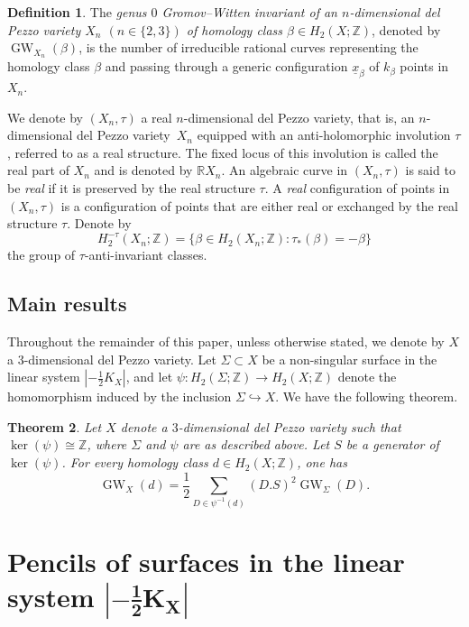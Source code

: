 \documentclass[10pt,a4paper]{article}
\numberwithin{equation}{section}
\theoremstyle{definition}
\newtheorem{definition}{Definition}[section]
\theoremstyle{plain}
\newtheorem{theorem}[definition]{Theorem}
\theoremstyle{remark}
\newcommand{\R}{\mathbb{R}}
\newcommand{\Z}{\mathbb{Z}}
\DeclareMathOperator{\GW}{GW}
\begin{document}
\begin{definition} \label{definitionGW}
The \emph{genus $0$ Gromov--Witten invariant of an  $n$-dimensional del Pezzo variety $X_n$ $(n\in \{2,3\})$ of homology class $\beta\in H_2(X;\Z)$},  denoted by $\GW_{X_n}(\beta)$, is the number of irreducible rational curves representing the homology class $\beta$ and passing through a generic configuration $\underline{x}_\beta$ of $k_\beta$ points in $X_n$.
\end{definition}

We denote by $(X_n,\tau)$ a real $n$-dimensional del Pezzo variety, that is, an $n$-dimensional del Pezzo variety~$X_n$ equipped with an anti-holomorphic involution  $\tau$, referred to as a real structure. The fixed locus of this involution is called the real part of $X_n$ and is denoted by $\R X_n$. An algebraic curve in  $(X_n,\tau)$  is said to be  \textit{real} if it is preserved by the real structure $\tau$. A \textit{real} configuration of points in  $(X_n,\tau)$ is a configuration of points that are either real or exchanged by the real structure $\tau$. Denote  by
$$ H_2^{-\tau}(X_n;\Z)=\{\beta \in H_2(X_n;\Z): \tau_*(\beta)=-\beta \}$$
the group of $\tau$-anti-invariant classes.

\setcounter{definition}{2}\setcounter{subsection}{1}

\subsection{Main results}



Throughout the remainder of this paper, unless otherwise stated, we denote by $X$ a $3$-dimensional del Pezzo variety. Let $\Sigma\subset X$ be a non-singular surface  in the linear system $|-\frac{1}{2}K_X|$, and let $\psi\colon H_2(\Sigma;\mathbb{Z})\rightarrow H_2(X;\mathbb{Z})$ denote the homomorphism induced by the inclusion $\Sigma \hookrightarrow X$. We have the following theorem.

\begin{theorem}\label{Theorem1-GW} 
Let $X$ denote a $3$-dimensional del Pezzo variety such that $\ker(\psi) \cong \Z$, where $\Sigma$ and $\psi$ are as described above. Let $S$ be a generator of\, $\ker (\psi)$.
For every homology class $d\in H_2(X;\Z)$, one has
$$\GW_X(d)=\frac{1}{2}\sum_{D\in \psi^{-1}(d)}(D.S)^2 \GW_{\Sigma}(D).$$
\end{theorem}

\section{Pencils of surfaces in the linear system \texorpdfstring{$\boldsymbol{|-\frac{1}{2}K_X|}$}{|-(1/2)K\textunderscore X|}} \label{Section-Pencils}
\end{document}
